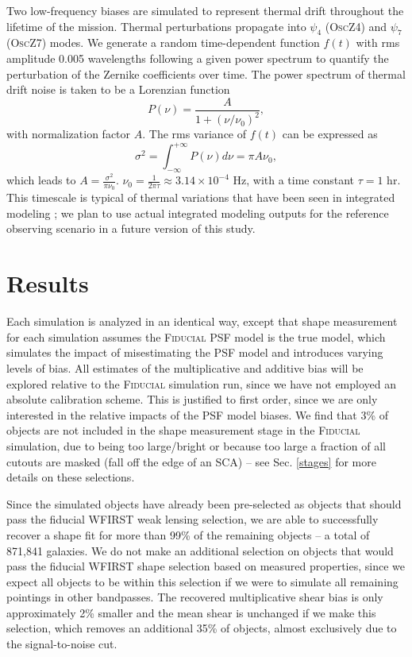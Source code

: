 \documentclass[usenatbib]{mnras}
\begin{document}
Two low-frequency biases are simulated to represent thermal drift throughout the lifetime of the mission. Thermal perturbations propagate into $\psi_4$ (\textsc{OscZ4})  and $\psi_7$ (\textsc{OscZ7}) modes.
We generate a random time-dependent function $f(t)$ with rms amplitude 0.005 wavelengths following a given power spectrum to quantify the perturbation of the Zernike coefficients over time. 
The power spectrum of thermal drift noise is taken to be a Lorenzian function 
\begin{equation}
P(\nu)=\frac{A}{1+(\nu/\nu_0)^2},
\end{equation}
with normalization factor $A$. The rms variance of $f(t)$ can be expressed as
\begin{equation}
\sigma^2 = \int_{-\infty}^{+\infty}P(\nu)d\nu=\pi A\nu_0,
\end{equation}
which leads to $A=\frac{\sigma^2}{\pi\nu_0}$. $\nu_0=\frac{1}{2\pi\tau}\approx 3.14\times10^{-4}$ Hz, with a time constant $\tau=1$ hr. This timescale is typical of thermal variations that have been seen in integrated modeling \citep[e.g.][]{2015arXiv150303757S}; we plan to use actual integrated modeling outputs for the reference observing scenario in a future version of this study.

\section{Results}\label{sec:results2}

Each simulation is analyzed in an identical way, except that shape measurement for each simulation assumes the \textsc{Fiducial} PSF model is the true model, which simulates the impact of misestimating the PSF model and introduces varying levels of bias. 
All estimates of the multiplicative and additive bias will be explored relative to the \textsc{Fiducial} simulation run, since we have not employed an absolute calibration scheme. 
This is justified to first order, since we are only interested in the relative impacts of the PSF model biases.
We find that 3\% of objects are not included in the shape measurement stage in the \textsc{Fiducial} simulation, due to being too large/bright or because too large a fraction of all cutouts are masked (fall off the edge of an SCA) -- see Sec. \ref{stages} for more details on these selections. 

Since the simulated objects have already been pre-selected as objects that should pass the fiducial WFIRST weak lensing selection, we are able to successfully recover a shape fit for more than 99\% of the remaining objects -- a total of 871,841 galaxies. 
We do not make an additional selection on objects that would pass the fiducial WFIRST shape selection based on measured properties, since we expect all objects to be within this selection if we were to simulate all remaining pointings in other bandpasses. 
The recovered multiplicative shear bias is only approximately 2\% smaller and the mean shear is unchanged if we make this selection, which removes an additional 35\% of objects, almost exclusively due to the signal-to-noise cut.
\end{document}
